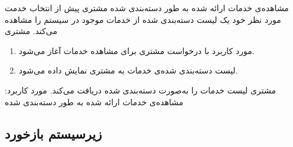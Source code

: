 
\usecase
{مشاهده‌ی خدمات ارائه شده به طور دسته‌بندی شده}
{}
{مشتری پیش از انتخاب خدمت مورد نظر خود یک لیست دسته‌بندی شده از خدمات موجود در سیستم را مشاهده می‌کند.}
{مشتری}
{}
{}
{
	\vspace*{-0.6cm}
	\begin{enumerate}
		\item 
		مورد کاربرد با درخواست مشتری برای مشاهده خدمات آغاز می‌شود.
		\item 
		لیست دسته‌بندی شده‌ی خدمات به مشتری نمایش داده می‌شود.
	\end{enumerate}
}
{مشتری لیست خدمات را به‌صورت دسته‌بندی شده دریافت می‌کند.}
{
}
{
	مورد کاربرد: مشاهده‌ی خدمات ارائه شده به طور دسته‌بندی شده
}


\subsection{زیرسیستم بازخورد}


